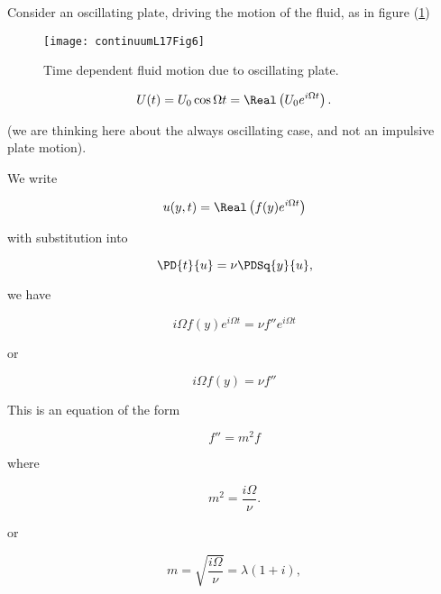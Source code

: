 Consider an oscillating plate, driving the motion of the fluid, as in figure (\ref{fig:continuumL17:continuumL17Fig6})
\begin{figure}[htp]
   \centering
   \texttt{[image: continuumL17Fig6]}
   \caption{Time dependent fluid motion due to oscillating plate.}\label{fig:continuumL17:continuumL17Fig6}
\end{figure}

\begin{equation}\label{eqn:continuumL17:260}
U(t) = U_0 \cos \Omega t = \Real\left( U_0 e^{i \Omega t} \right).
\end{equation}

(we are thinking here about the always oscillating case, and not an impulsive plate motion).

We write

\begin{equation}\label{eqn:continuumL17:280}
u(y, t) = \Real\left( f(y) e^{i \Omega t} \right)
\end{equation}

with substitution into 

\begin{equation}\label{eqn:continuumL17:300}
\PD{t}{u} = \nu \PDSq{y}{u},
\end{equation}

we have

\begin{equation}\label{eqn:continuumL17:320}
i \Omega f(y) e^{i \Omega t} = \nu f'' e^{i \Omega t}
\end{equation}

or

\begin{equation}\label{eqn:continuumL17:340}
i \Omega f(y) = \nu f'' 
\end{equation}

This is an equation of the form

\begin{equation}\label{eqn:continuumL17:360}
f'' = m^2 f
\end{equation}

where

\begin{equation}\label{eqn:continuumL17:380}
m^2 = \frac{i \Omega}{\nu}.
\end{equation}

or

\begin{equation}\label{eqn:continuumL17:400}
m = \sqrt{\frac{i \Omega}{\nu}} = \lambda (1 + i),
\end{equation}

